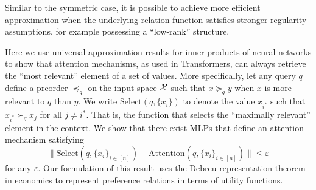 Similar to the symmetric case, it is possible to achieve more efficient approximation when the underlying relation function satisfies stronger regularity assumptions, for example possessing a ``low-rank'' structure.

 Here we use universal approximation results for inner products of neural networks to show that attention mechanisms, as used in Transformers, can always retrieve the ``most relevant'' element of a set of values.  More specifically, let any query $q$ define a preorder $\preceq_q$ on the input space ${\mathcal{X}}$ such that $x \succeq_q y$ when $x$ is more relevant to $q$ than $y$. We write $\mathrm{Select}(q, \{x_i\})$ to denote the value $x_{i^*}$ such that $x_{i^*} \succ_q x_j$ for all $j \neq i^*$. That is, the function that selects the ``maximally relevant'' element in the context. We show that there exist MLPs that define an attention mechanism satisfying 
\[\|\mathrm{Select}(q, \{x_i\}_{i \in [n]}) - \mathrm{Attention}(q, \{x_i\}_{i \in [n]})\| \leq \varepsilon\]
for any $\varepsilon$. Our formulation of this result uses the Debreu representation theorem in economics to represent preference relations in terms of utility functions.